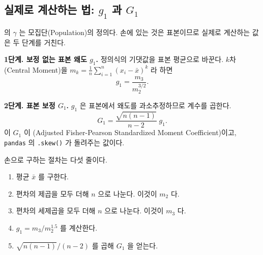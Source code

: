 \subsection{실제로 계산하는 법: $g_1$ 과 $G_1$}
\label{sec:skew-compute}

의 $\gamma$ 는 모집단(Population)의 정의다. 손에 있는 것은 표본이므로
실제로 계산하는 값은 두 단계를 거친다.

\textbf{1단계. 보정 없는 표본 왜도 $g_1$.} 정의식의 기댓값을 표본 평균으로 바꾼다.
$k$차 (Central Moment)을 $m_k = \frac{1}{n}\sum_{i=1}^{n}(x_i - \bar{x})^k$
라 하면
\[
  g_1 = \frac{m_3}{m_2^{3/2}} .
\]

\textbf{2단계. 표본 보정 $G_1$.} $g_1$ 은 표본에서 왜도를 과소추정하므로 계수를 곱한다.
\[
  G_1 = \frac{\sqrt{n(n-1)}}{n-2}\; g_1 .
\]
이 $G_1$ 이 (Adjusted Fisher-Pearson
Standardized Moment Coefficient)이고, \texttt{pandas} 의 \texttt{.skew()} 가 돌려주는 값이다.

손으로 구하는 절차는 다섯 줄이다.

\begin{enumerate}
  \item 평균 $\bar{x}$ 를 구한다.
  \item 편차의 제곱을 모두 더해 $n$ 으로 나눈다. 이것이 $m_2$ 다.
  \item 편차의 세제곱을 모두 더해 $n$ 으로 나눈다. 이것이 $m_3$ 다.
  \item $g_1 = m_3 / m_2^{1.5}$ 를 계산한다.
  \item $\sqrt{n(n-1)}/(n-2)$ 를 곱해 $G_1$ 을 얻는다.
\end{enumerate}

